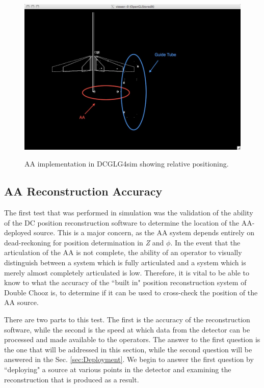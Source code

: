 \begin{figure}
\caption{AA implementation in DCGLG4sim showing relative positioning.}
\includegraphics[width=\textwidth]{AA/4_13_Cal_Group_Pres_01.jpg}
\label{DCGLG4}
\end{figure}


\subsection{AA Reconstruction Accuracy}

The first test that was performed in simulation was the validation of the ability of the DC position reconstruction software to determine the location of the AA-deployed source. This is a major concern, as the AA system depends entirely on dead-reckoning for position determination in \emph{Z} and $\phi$. In the event that the articulation of the AA is not complete, the ability of an operator to visually distinguish between a system which is fully articulated and a system which is merely almost completely articulated is low. Therefore, it is vital to be able to know to what the accuracy of the ``built in" position reconstruction system of Double Chooz is, to determine if it can be used to cross-check the position of the AA source.

There are two parts to this test. The first is the accuracy of the reconstruction software, while the second is the speed at which data from the detector can be processed and made available to the operators. The answer to the first question is the one that will be addressed in this section, while the second question will be answered in the Sec. \ref{sec:Deployment}.  We begin to answer the first question by ``deploying"  a source at various points in the detector and examining the reconstruction that is produced as a result. 

